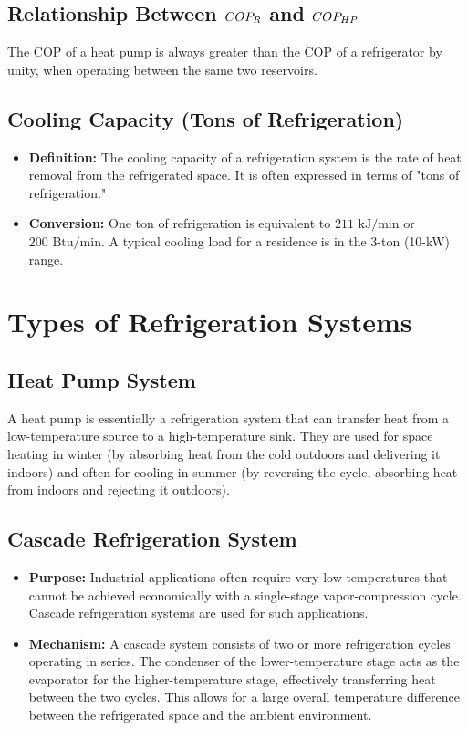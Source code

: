 \subsection{Relationship Between $COP_R$ and $COP_{HP}$}
The COP of a heat pump is always greater than the COP of a refrigerator by unity, when operating between the same two reservoirs.

\subsection{Cooling Capacity (Tons of Refrigeration)}
\begin{itemize}
    \item \textbf{Definition:} The cooling capacity of a refrigeration system is the rate of heat removal from the refrigerated space. It is often expressed in terms of "tons of refrigeration."
    \item \textbf{Conversion:} One ton of refrigeration is equivalent to $211 \text{ kJ/min}$ or $200 \text{ Btu/min}$. A typical cooling load for a residence is in the 3-ton (10-kW) range.
\end{itemize}

\section{Types of Refrigeration Systems}

\subsection{Heat Pump System}
A heat pump is essentially a refrigeration system that can transfer heat from a low-temperature source to a high-temperature sink. They are used for space heating in winter (by absorbing heat from the cold outdoors and delivering it indoors) and often for cooling in summer (by reversing the cycle, absorbing heat from indoors and rejecting it outdoors).

\subsection{Cascade Refrigeration System}
\begin{itemize}
    \item \textbf{Purpose:} Industrial applications often require very low temperatures that cannot be achieved economically with a single-stage vapor-compression cycle. Cascade refrigeration systems are used for such applications.
    \item \textbf{Mechanism:} A cascade system consists of two or more refrigeration cycles operating in series. The condenser of the lower-temperature stage acts as the evaporator for the higher-temperature stage, effectively transferring heat between the two cycles. This allows for a large overall temperature difference between the refrigerated space and the ambient environment.
\end{itemize}

